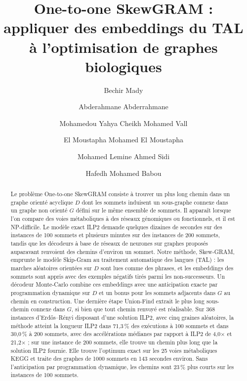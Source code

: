 \documentclass{llncs}
\begin{document}
\title{One-to-one SkewGRAM : appliquer des embeddings du TAL à l'optimisation de graphes biologiques}

\author{Bechir Mady \and
Abderahmane Abderrahmane \and
Mohamedou Yahya Cheikh Mohamed Vall \and
El Moustapha Mohamed El Moustapha \and
Mohamed Lemine Ahmed Sidi \and
Hafedh Mohamed Babou}


\maketitle

\begin{abstract}
Le problème One-to-one SkewGRAM consiste à trouver un plus long chemin dans un graphe orienté acyclique $D$ dont les sommets induisent un sous-graphe connexe dans un graphe non orienté $G$ défini sur le même ensemble de sommets. Il apparaît lorsque l'on compare des voies métaboliques à des réseaux génomiques ou fonctionnels, et il est NP-difficile. Le modèle exact ILP2 demande quelques dizaines de secondes sur des instances de 100 sommets et plusieurs minutes sur des instances de 200 sommets, tandis que les décodeurs à base de réseaux de neurones sur graphes proposés auparavant renvoient des chemins d'environ un sommet. Notre méthode, Skew-GRAM, emprunte le modèle Skip-Gram au traitement automatique des langues (TAL) : les marches aléatoires orientées sur $D$ sont lues comme des phrases, et les embeddings des sommets sont appris avec des exemples négatifs tirés parmi les non-successeurs. Un décodeur Monte-Carlo combine ces embeddings avec une anticipation exacte par programmation dynamique sur $D$ et un bonus pour les sommets adjacents dans $G$ au chemin en construction. Une dernière étape Union-Find extrait le plus long sous-chemin connexe dans $G$, si bien que tout chemin renvoyé est réalisable. Sur 368 instances d'Erd\H{o}s--Rényi disposant d'une solution ILP2, avec cinq graines aléatoires, la méthode atteint la longueur ILP2 dans 71,3\,\% des exécutions à 100 sommets et dans 30,0\,\% à 200 sommets, avec des accélérations médianes par rapport à ILP2 de 4,0$\times$ et 21,2$\times$ ; sur une instance de 200 sommets, elle trouve un chemin plus long que la solution ILP2 fournie. Elle trouve l'optimum exact sur les 25 voies métaboliques KEGG et traite des graphes de 1000 sommets en 143 secondes environ. Sans l'anticipation par programmation dynamique, les chemins sont 23\,\% plus courts sur les instances de 100 sommets.

\end{abstract}
\end{document}
